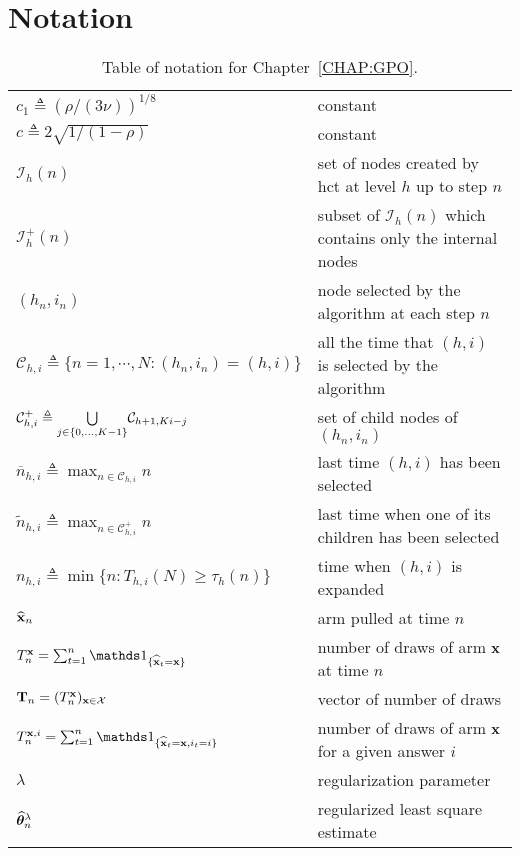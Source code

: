 \section{Notation}\label{app:gpo.notation}

\begin{table}[ht]
	\centering
	\caption{Table of notation for Chapter~\ref{CHAP:GPO}.}
	\begin{tabular}{@{}l|l@{}}
		\toprule
		\thead{Notation} & \thead{Meaning} \\ \midrule
		$c_1 \triangleq (\rho/(3\nu))^{1/8}$ & constant \\
        $c \triangleq 2\sqrt{1/(1-\rho)}$ & constant \\
		$\mathcal{I}_h(n)$ & set of nodes created by \gls{hct} at level $h$ up to step $n$ \\
        $\mathcal{I}_h^{+}(n)$ & subset of $\mathcal{I}_h(n)$ which contains only the internal nodes \\
        $(h_n,i_n)$ & node selected by the algorithm at each step $n$ \\
        $\mathcal{C}_{h,i} \triangleq \{n = 1,\cdots,N : (h_n,i_n) = (h,i)\}$ & all the time that $(h,i)$ is selected by the algorithm \\
        $\mathcal{C}_{h,i}^{+} \triangleq \underset{j\in\{0,\ldots,K-1\}}{\bigcup} \mathcal{C}_{h+1,Ki-j}$ & set of child nodes of $(h_n,i_n)$ \\
        $\overline{n}_{h,i} \triangleq \max_{n\in\mathcal{C}_{h,i}} n$ & last time $(h,i)$ has been selected \\
        $\tilde{n}_{h,i} \triangleq \max_{n\in\mathcal{C}_{h,i}^{+}} n$ & last time when one of its children has been selected \\
        $n_{h,i} \triangleq \min\{n: T_{h,i}(N) \geq \tau_h(n)\}$  & time when $(h,i)$ is expanded \\
        $\widehat{{\bf x}}_n$ & arm pulled at time $n$ \\
        $T_n^\bx = \sum_{t=1}^n \ind_{\{\hbx_t = \bx\}}$ & number of draws of arm ${\bf x}$ at time $n$\\
        ${\bf T}_n =(T_n^{\bf x})_{{\bf x}\in\mathcal{X}}$ & vector of number of draws\\
        $T_n^{\bx,i} = \sum_{t=1}^n \ind_{\{\hbx_t = \bx, i_t = i\}}$ & number of draws of arm ${\bf x}$ for a given answer $i$\\
        $\lambda$ & regularization parameter\\
        $\widehat{{\boldsymbol \theta}}_n^\lambda$ & regularized least square estimate\\
		\bottomrule
	\end{tabular}
\end{table}

